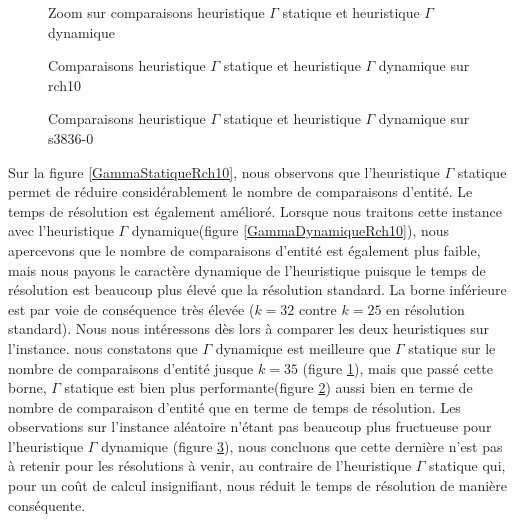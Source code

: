 \begin{figure}
\centering
	
\caption{Zoom sur comparaisons heuristique $\Gamma$ statique et heuristique $\Gamma$ dynamique}
\label{compGammaZoom}
\end{figure}

\begin{figure}
\centering
	\begin{minipage}[c]{0.49\linewidth}
	\centering
	
	\end{minipage}
	\begin{minipage}[c]{0.49\linewidth}
	\centering
	
	\end{minipage}
\caption{Comparaisons heuristique $\Gamma$ statique et heuristique $\Gamma$ dynamique sur rch10}
\label{compGamma}
\end{figure}

\begin{figure}
\centering
	\begin{minipage}[c]{0.49\linewidth}
	\centering
	
	\end{minipage}
	\begin{minipage}[c]{0.49\linewidth}
	\centering
	
	\end{minipage}
\caption{Comparaisons heuristique $\Gamma$ statique et heuristique $\Gamma$ dynamique sur s3836-0}
\label{compGammaS3836}
\end{figure}

Sur la figure \ref{GammaStatiqueRch10}, nous observons que l'heuristique $\Gamma$ statique permet de réduire considérablement le nombre de comparaisons d'entité. Le temps de résolution est également amélioré. Lorsque nous traitons cette instance avec l'heuristique $\Gamma$ dynamique(figure \ref{GammaDynamiqueRch10}), nous apercevons que le nombre de comparaisons d'entité est également plus faible, mais nous payons le caractère dynamique de l'heuristique puisque le temps de résolution est beaucoup plus élevé que la résolution standard. La borne inférieure est par voie de conséquence très élevée ($k=32$ contre $k=25$ en résolution standard). Nous nous intéressons dès lors à comparer les deux heuristiques sur l'instance. nous constatons que $\Gamma$ dynamique est meilleure que $\Gamma$ statique sur le nombre de comparaisons d'entité jusque $k=35$ (figure \ref{compGammaZoom}), mais que passé cette borne, $\Gamma$ statique est bien plus performante(figure \ref{compGamma}) aussi bien en terme de nombre de comparaison d'entité que en terme de temps de résolution. Les observations sur l'instance aléatoire n'étant pas beaucoup plus fructueuse pour l'heuristique $\Gamma$ dynamique (figure \ref{compGammaS3836}), nous concluons que cette dernière n'est pas à retenir pour les résolutions à venir, au contraire de l'heuristique $\Gamma$ statique qui, pour un coût de calcul insignifiant, nous réduit le temps de résolution de manière conséquente.

